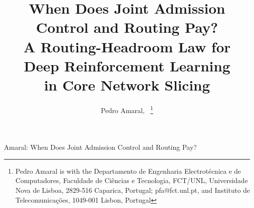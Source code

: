\documentclass[10pt,journal,comsoc]{IEEEtran}
\begin{document}
\title{When Does Joint Admission Control and Routing Pay?\\
A Routing-Headroom Law for Deep Reinforcement Learning\\
in Core Network Slicing}

\author{Pedro Amaral,~
\thanks{Pedro Amaral is with the Departamento de Engenharia Electrot\'ecnica e de Computadores, Faculdade de Ci\^encias e Tecnologia,
FCT/UNL, Universidade Nova de Lisboa, 2829-516 Caparica, Portugal; pfa@fct.unl.pt, and Instituto de Telecomunica\c{c}\~oes, 1049-001 Lisbon, Portugal}%
}

%
{Amaral: When Does Joint Admission Control and Routing Pay?}

\maketitle
\end{document}
